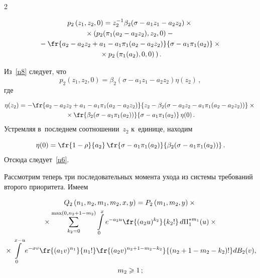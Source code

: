 \begin{multicols}{2}
\vspace*{-3pt}

\noindent
\begin{multline}
\label{n8}
p_2\left(z_1,z_2,0\right)=z_2^{-1}\beta_2(\sigma-a_1z_1-a_2z_2)\times{}\\
{}\times \left(
\vphantom{\fr{s_1+a_2-a_2w_2+a_1-a_1\pi_1(s_1+a_2-a_2w_2)}{s_1+\sigma-a_1\pi_1(s_1+a_2)}}
p_2(\pi_1(a_2-a_2z_2),z_2,0)-{}\right.\\
{}-
\fr{a_2-a_2z_2+a_1-a_1\pi_1(a_2-a_2z_2)}{\sigma-a_1\pi_1(a_2)}\times{}\\
\left.{}\times
p_2\left(\pi_1(a_2),0,0\right)
\vphantom{\fr{s_1+a_2-a_2w_2+a_1-a_1\pi_1(s_1+a_2-a_2w_2)}{s_1+\sigma-a_1\pi_1(s_1+a_2)}}
\right).
\end{multline}

\vspace*{-3pt}

\noindent
Из~\eqref{n8} следует, что
$$
p_2(z_1,z_2,0)=\beta_2\left(\sigma-a_1z_1-a_2z_2\right)\eta\left(z_2\right)\,,
$$
где

\vspace*{-2pt}

\noindent
\begin{multline*}
\eta(z_2)=-\fr{a_2-a_2z_2+a_1-a_1\pi_1(a_2-a_2z_2)}
{z_2-\beta_2(\sigma-a_2z_2-a_1\pi_1(a_2-a_2z_2))}\times{}\\
{}\times
\fr{\beta_2(\sigma-a_1\pi_1(a_2))}{\sigma-a_1\pi_1(a_2)}\,\eta(0)\,.
\end{multline*}
Устремляя в~последнем соотношении~$z_2$ к~единице, находим

\noindent
$$
\eta(0)=\fr{1-\rho}{a_2}\,\fr{\sigma-a_1\pi_1(a_2)}{\beta_2(\sigma-a_1\pi_1(a_2))}\,.
$$
Отсюда следует~\eqref{n6}.

Рассмотрим теперь три последовательных момента ухода из системы требований 
второго приоритета. Имеем

\noindent
\begin{multline*}
Q_2\left(n_1,n_2,m_1,m_2,x,y\right)=P_2\left(m_1,m_2,y\right)\times{}\\
{}\times \sum\limits_{k_2=0}^{\max(0,n_2+1-m_2)}
\int\limits_0^xe^{-a_2u}\fr{(a_2u)^{k_2}}{k_2!}\,d\Pi_1^{*m_1}(u)
\times{}\\
{}\times \int\limits_0^{x-u}e^{-\sigma v}\fr{(a_1v)^{n_1}}{n_1!}
\fr{(a_2v)^{n_2+1-m_2-k_2}}{(n_2+1-m_2-k_2)!}dB_2(v),\\ m_2\geqslant 1\,;
\end{multline*}

\vspace*{-12pt}


\end{multicols}
